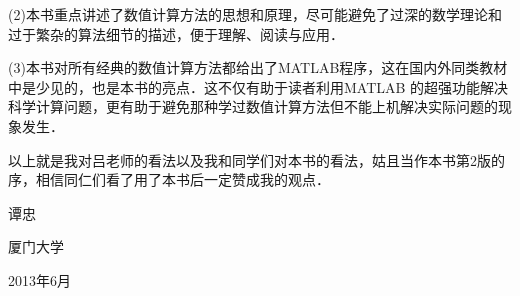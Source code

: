(2)本书重点讲述了数值计算方法的思想和原理，尽可能避免了过深的数学理论和过于繁杂的算法细节的描述，便于理解、阅读与应用．

(3)本书对所有经典的数值计算方法都给出了MATLAB程序，这在国内外同类教材中是少见的，也是本书的亮点．这不仅有助于读者利用MATLAB 的超强功能解决科学计算问题，更有助于避免那种学过数值计算方法但不能上机解决实际问题的现象发生．


以上就是我对吕老师的看法以及我和同学们对本书的看法，姑且当作本书第2版的序，相信同仁们看了用了本书后一定赞成我的观点．


\vspace{2cm}

\hfill 谭忠\hspace{1.5em}

\hfill 厦门大学\hspace{0.5em}

\hfill 2013年6月\hspace{0em}
